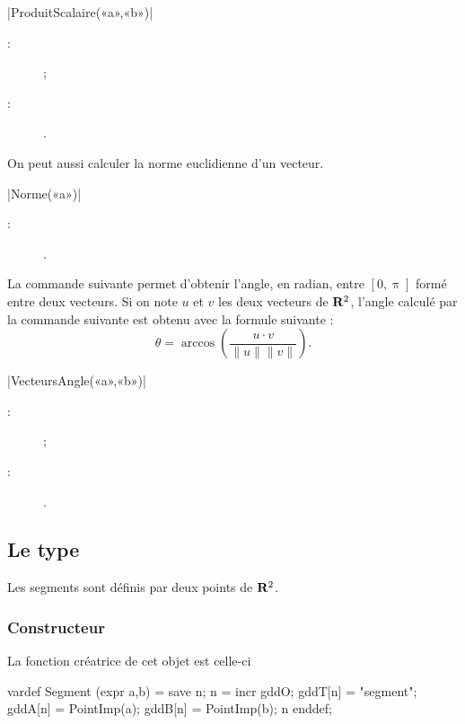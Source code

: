 \documentclass[a4paper,french]{article}
\begin{document}
\begin{colourband}
\macro|ProduitScalaire(«a»,«b»)|
\begin{description}
  \item[:]  ;
  \item[:] .
\end{description}
\end{colourband}
\bigskip

On peut aussi calculer la norme euclidienne d'un vecteur.
\begin{colourband}
\macro|Norme(«a»)|
\begin{description}
  \item[:] .
\end{description}
\end{colourband}
\bigskip

La commande suivante permet d'obtenir l'angle, en radian, entre $[0,\uppi]$ formé
entre deux vecteurs. Si on note $u$ et $v$ les deux vecteurs de $\mathbf{R}^2$, l'angle
calculé par la commande suivante est obtenu avec la formule suivante :
\[\theta = \arccos \left(\frac{u\cdot v}{\|u\|\|v\|}\right).\]

\begin{colourband}
\macro|VecteursAngle(«a»,«b»)|
\begin{description}
  \item[:]  ;
  \item[:] .
\end{description}
\end{colourband}
\bigskip


\subsection{Le type }
Les segments sont
définis par deux points de $\mathbf{R}^2$.


\subsubsection{Constructeur}
La fonction créatrice de cet objet est
celle-ci
\begin{mpcode}
vardef Segment (expr a,b) =
  save n; n = incr gddO;
  gddT[n] = "segment"; gddA[n] = PointImp(a); gddB[n] = PointImp(b); n
enddef;
\end{mpcode}
\end{document}
